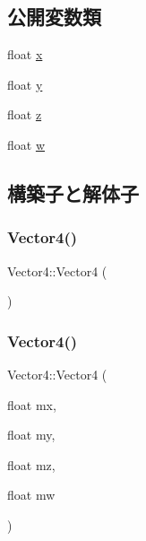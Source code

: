 \subsection*{公開変数類}
\begin{DoxyCompactItemize}
\item 
float \mbox{\hyperlink{struct_math_1_1_vector4_aabc3a396f22543febe004e90fe2478ae}{x}}
\item 
float \mbox{\hyperlink{struct_math_1_1_vector4_a5c29d7713c4916e43aa7503ce0a12422}{y}}
\item 
float \mbox{\hyperlink{struct_math_1_1_vector4_a19783130af1a604480e028c455608180}{z}}
\item 
float \mbox{\hyperlink{struct_math_1_1_vector4_acce70d2376e6bdf31f9afe070d51e01f}{w}}
\end{DoxyCompactItemize}


\subsection{構築子と解体子}
\mbox{\label{struct_math_1_1_vector4_a511b4d9c8326c235b76d794eea018921}} 
\subsubsection{\texorpdfstring{Vector4()}{Vector4()}\hspace{0.1cm}{\footnotesize\ttfamily [1/5]}}
{\footnotesize\ttfamily Vector4\+::\+Vector4 (\begin{DoxyParamCaption}{ }\end{DoxyParamCaption})}

\mbox{\label{struct_math_1_1_vector4_af5f77f07dda167390f1e4995971a9511}} 
\subsubsection{\texorpdfstring{Vector4()}{Vector4()}\hspace{0.1cm}{\footnotesize\ttfamily [2/5]}}
{\footnotesize\ttfamily Vector4\+::\+Vector4 (\begin{DoxyParamCaption}\item[{float}]{mx,  }\item[{float}]{my,  }\item[{float}]{mz,  }\item[{float}]{mw }\end{DoxyParamCaption})}

